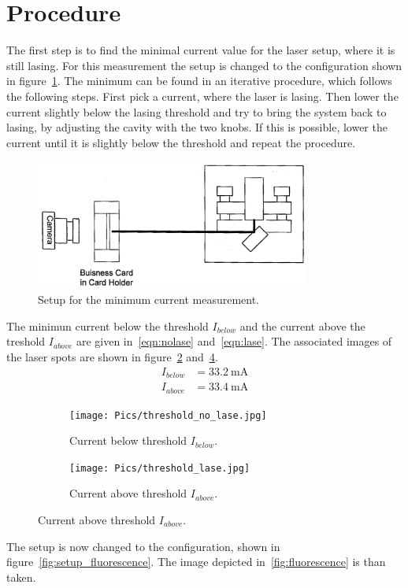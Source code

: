 \section{Procedure}
\label{sec:Procedure}

The first step is to find the minimal current value for the laser setup, where
it is still lasing. For this measurement the setup is changed to the configuration shown in
figure~\ref{fig:setup_current}.
The minimum can be found in an iterative procedure, which follows the following
steps. First pick a current, where the laser is lasing.
Then lower the current slightly below the lasing threshold and try to bring the system back to lasing,
by adjusting the cavity with the two knobs.
If this is possible, lower the current
until it is slightly below the threshold and repeat the procedure.

\begin{figure}
  \vspace{-10pt}
  \centering
  \includegraphics[width=0.8\textwidth]{Pics/setup_threshold.png}
  \caption{Setup for the minimum current measurement.\cite{anleitung}}
  \label{fig:setup_current}
\end{figure}

The minimun current below the threshold $I_{below}$ and the current above the treshold $I_{above}$
are given in~\eqref{eqn:nolase} and~\eqref{eqn:lase}.
The associated images of the laser spots are shown in figure~\ref{fig:no_lase}
and~\ref{fig:lase}.
\vspace{-10pt}
\begin{align}
  \label{eqn:nolase}
  I_{below} &= \SI{33.2}{\milli\ampere}\\
  \label{eqn:lase}
  I_{above} &= \SI{33.4}{\milli\ampere}
\end{align}

\begin{figure}[h!]
  \centering
  \begin{subfigure}{0.48\textwidth}
    \centering
    \texttt{[image: Pics/threshold\_no\_lase.jpg]}
    \caption{Current below threshold $I_{below}$.}
    \label{fig:no_lase}
  \end{subfigure}
  \begin{subfigure}{0.48\textwidth}
    \centering
    \texttt{[image: Pics/threshold\_lase.jpg]}
    \caption{Current above threshold $I_{above}$.}
    \label{fig:lase}
  \end{subfigure}
\end{figure}
\FloatBarrier
The setup is now changed to the configuration, shown in figure~\ref{fig:setup_fluorescence}.
The image depicted in~\ref{fig:fluorescence} is than taken.

